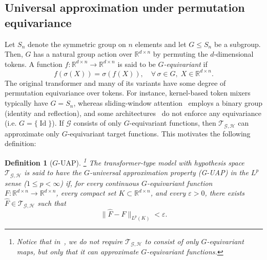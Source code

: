 \documentclass{article}
\newtheorem{definition}{Definition}
\begin{document}
\subsection{Universal approximation under permutation equivariance}
Let ${S}_n$ denote the symmetric group on $n$ elements and let $G\leq {S}_n$ be a subgroup. Then, $G$ has a natural group action over $\mathbb R^{d\times n}$ by permuting the $d$-dimensional tokens. A function $f:\mathbb{R}^{d\times n}\to\mathbb{R}^{d\times n}$ is said to be \emph{$G$-equivariant} if
\begin{equation}
    f(\sigma(X))=\sigma(f(X)),\quad \forall\,\sigma\in G,\; X\in\mathbb{R}^{d\times n}.
\end{equation}
The original transformer and many of its variants have some degree of permutation equivariance over tokens. For instance, kernel-based token mixers~\cite{vaswani2017attention,choromanski2020rethinking} typically have $G={S}_n$, whereas sliding-window attention~\cite{beltagy2020longformer} employs a binary group (identity and reflection), and some architectures~\cite{zaheer2020big,wang2020linformer} do not enforce any equivariance (i.e. $G=\{\operatorname{Id}\}$). If $\mathcal G$ consists of only $G$-equivariant functions, then $\mathcal T_{\mathcal G,\mathcal H}$ can approximate only $G$-equivariant target functions. This motivates the following definition:

\begin{definition}[$G$-UAP]\footnote{Notice that in~, we do not require $\mathcal T_{\mathcal G,\mathcal H}$ to consist of only $G$-equivariant maps, but only that it can approximate $G$-equivariant functions. }
    \label{def:G-UAP}
    The transformer-type model with hypothesis space $\mathcal{T}_{\mathcal{G},\mathcal{H}}$ is said to have the \emph{$G$-universal approximation property (G-UAP)} in the $L^p$ sense ($1\le p<\infty$) if, for every continuous $G$-equivariant function $F:\mathbb R^{d\times n}\to\mathbb{R}^{d\times n}$, every compact set $K\subset\mathbb R^{d\times n}$, and every $\varepsilon>0$, there exists $\hat{F}\in\mathcal{T}_{\mathcal{G},\mathcal{H}}$ such that
    \begin{equation}
        \|\hat{F}-F\|_{L^p(K)}<\varepsilon.
    \end{equation}
\end{definition}
\end{document}
